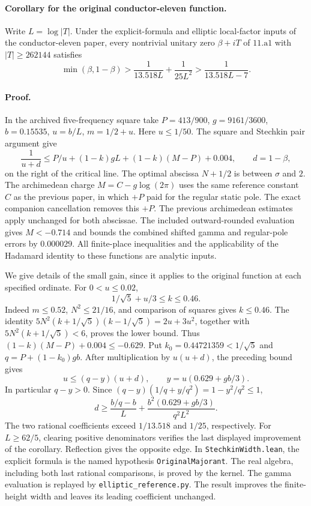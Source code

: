 \paragraph{Corollary for the original conductor-eleven function.}
Write $L=\log|T|$. Under the explicit-formula and elliptic local-factor inputs of the conductor-eleven paper, every nontrivial unitary zero $\beta+iT$ of $11.\mathrm{a1}$ with $|T|\ge262144$ satisfies
\[
 \min(\beta,1-\beta)>
 \frac1{13.518 L}+\frac1{25L^2}>
 \frac1{13.518 L-7}.
\]

\paragraph{Proof.}
In the archived five-frequency square take $P=413/900$, $g=9161/3600$, $b=0.15535$, $u=b/L$, $m=1/2+u$. Here $u\le1/50$. The square and Stechkin pair argument give
\[
 \frac1{u+d}\le P/u+(1-k)gL+(1-k)(M-P)+0.004,
 \qquad d=1-\beta,
\]
on the right of the critical line. The optimal abscissa $N+1/2$ is between $\sigma$ and $2$. The archimedean charge $M=C-g\log(2\pi)$ uses the same reference constant $C$ as the previous paper, in which $+P$ paid for the regular static pole. The exact companion cancellation removes this $+P$. The previous archimedean estimates apply unchanged for both abscissae. The included outward-rounded evaluation gives $M<-0.714$ and bounds the combined shifted gamma and regular-pole errors by $0.000029$. All finite-place inequalities and the applicability of the Hadamard identity to these functions are analytic inputs.

We give details of the small gain, since it applies to the original function at each specified ordinate. For $0<u\le0.02$,
\[
 1/\sqrt5+u/3\le k\le0.46.
\]
Indeed $m\le0.52$, $N^2\le21/16$, and comparison of squares gives $k\le0.46$. The identity
$5N^2(k+1/\sqrt5)(k-1/\sqrt5)=2u+3u^2$, together with
$5N^2(k+1/\sqrt5)<6$, proves the lower bound. Thus $(1-k)(M-P)+0.004\le-0.629$.
Put $k_0=0.44721359<1/\sqrt5$ and $q=P+(1-k_0)gb$. After multiplication by $u(u+d)$, the preceding bound gives
\[
 u\le(q-y)(u+d),\qquad y=u(0.629+gb/3).
\]
In particular $q-y>0$. Since $(q-y)(1/q+y/q^2)=1-y^2/q^2\le1$,
\[
 d\ge\frac{b/q-b}{L}+
         \frac{b^2(0.629+gb/3)}{q^2 L^2}.
\]
The two rational coefficients exceed $1/13.518$ and $1/25$, respectively. For $L\ge62/5$, clearing positive denominators verifies the last displayed improvement of the corollary. Reflection gives the opposite edge. In \texttt{StechkinWidth.lean}, the explicit formula is the named hypothesis \texttt{OriginalMajorant}. The real algebra, including both last rational comparisons, is proved by the kernel. The gamma evaluation is replayed by \texttt{elliptic\_reference.py}. The result improves the finite-height width and leaves its leading coefficient unchanged.
